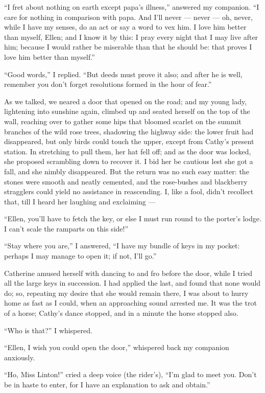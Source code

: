 \par “I fret about nothing on earth except papa's illness,” answered my companion. “I care for nothing in comparison with papa. And I'll never — never — oh, never, while I have my senses, do an act or say a word to vex him. I love him better than myself, Ellen; and I know it by this: I pray every night that I may live after him; because I would rather be miserable than that he should be: that proves I love him better than myself.”
\par “Good words,” I replied. “But deeds must prove it also; and after he is well, remember you don't forget resolutions formed in the hour of fear.”
\par As we talked, we neared a door that opened on the road; and my young lady, lightening into sunshine again, climbed up and seated herself on the top of the wall, reaching over to gather some hips that bloomed scarlet on the summit branches of the wild rose trees, shadowing the highway side: the lower fruit had disappeared, but only birds could touch the upper, except from Cathy's present station. In stretching to pull them, her hat fell off; and as the door was locked, she proposed scrambling down to recover it. I bid her be cautious lest she got a fall, and she nimbly disappeared. But the return was no such easy matter: the stones were smooth and neatly cemented, and the rose-bushes and blackberry stragglers could yield no assistance in reascending. I, like a fool, didn't recollect that, till I heard her laughing and exclaiming —
\par “Ellen, you'll have to fetch the key, or else I must run round to the porter's lodge. I can't scale the ramparts on this side!”
\par “Stay where you are,” I answered, “I have my bundle of keys in my pocket: perhaps I may manage to open it; if not, I'll go.”
\par Catherine amused herself with dancing to and fro before the door, while I tried all the large keys in succession. I had applied the last, and found that none would do; so, repeating my desire that she would remain there, I was about to hurry home as fast as I could, when an approaching sound arrested me. It was the trot of a horse; Cathy's dance stopped, and in a minute the horse stopped also.
\par “Who is that?” I whispered.
\par “Ellen, I wish you could open the door,” whispered back my companion anxiously.
\par “Ho, Miss Linton!” cried a deep voice (the rider's), “I'm glad to meet you. Don't be in haste to enter, for I have an explanation to ask and obtain.”
